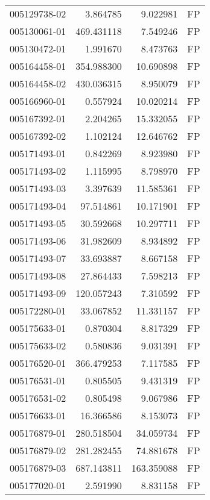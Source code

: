 \begin{tabular}{lrrl}
005129738-02 &    3.864785 &       9.022981 &   FP \\
005130061-01 &  469.431118 &       7.549246 &   FP \\
005130472-01 &    1.991670 &       8.473763 &   FP \\
005164458-01 &  354.988300 &      10.690898 &   FP \\
005164458-02 &  430.036315 &       8.950079 &   FP \\
005166960-01 &    0.557924 &      10.020214 &   FP \\
005167392-01 &    2.204265 &      15.332055 &   FP \\
005167392-02 &    1.102124 &      12.646762 &   FP \\
005171493-01 &    0.842269 &       8.923980 &   FP \\
005171493-02 &    1.115995 &       8.798970 &   FP \\
005171493-03 &    3.397639 &      11.585361 &   FP \\
005171493-04 &   97.514861 &      10.171901 &   FP \\
005171493-05 &   30.592668 &      10.297711 &   FP \\
005171493-06 &   31.982609 &       8.934892 &   FP \\
005171493-07 &   33.693887 &       8.667158 &   FP \\
005171493-08 &   27.864433 &       7.598213 &   FP \\
005171493-09 &  120.057243 &       7.310592 &   FP \\
005172280-01 &   33.067852 &      11.331157 &   FP \\
005175633-01 &    0.870304 &       8.817329 &   FP \\
005175633-02 &    0.580836 &       9.031391 &   FP \\
005176520-01 &  366.479253 &       7.117585 &   FP \\
005176531-01 &    0.805505 &       9.431319 &   FP \\
005176531-02 &    0.805498 &       9.067986 &   FP \\
005176633-01 &   16.366586 &       8.153073 &   FP \\
005176879-01 &  280.518504 &      34.059734 &   FP \\
005176879-02 &  281.282455 &      74.881678 &   FP \\
005176879-03 &  687.143811 &     163.359088 &   FP \\
005177020-01 &    2.591990 &       8.831158 &   FP \\

\end{tabular}
